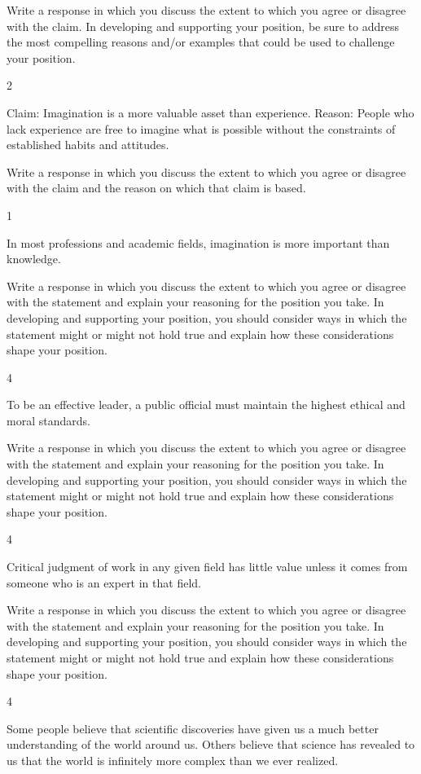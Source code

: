 \documentclass[]{article}
\begin{document}
Write a response in which you discuss the extent to which you agree or
disagree with the claim. In developing and supporting your position, be
sure to address the most compelling reasons and/or examples that could
be used to challenge your position.

2

Claim: Imagination is a more valuable asset than experience. Reason:
People who lack experience are free to imagine what is possible without
the constraints of established habits and attitudes.

Write a response in which you discuss the extent to which you agree or
disagree with the claim and the reason on which that claim is based.

1

In most professions and academic fields, imagination is more important
than knowledge.

Write a response in which you discuss the extent to which you agree or
disagree with the statement and explain your reasoning for the position
you take. In developing and supporting your position, you should
consider ways in which the statement might or might not hold true and
explain how these considerations shape your position.

4

To be an effective leader, a public official must maintain the highest
ethical and moral standards.

Write a response in which you discuss the extent to which you agree or
disagree with the statement and explain your reasoning for the position
you take. In developing and supporting your position, you should
consider ways in which the statement might or might not hold true and
explain how these considerations shape your position.

4

Critical judgment of work in any given field has little value unless it
comes from someone who is an expert in that field.

Write a response in which you discuss the extent to which you agree or
disagree with the statement and explain your reasoning for the position
you take. In developing and supporting your position, you should
consider ways in which the statement might or might not hold true and
explain how these considerations shape your position.

4

Some people believe that scientific discoveries have given us a much
better understanding of the world around us. Others believe that science
has revealed to us that the world is infinitely more complex than we
ever realized.
\end{document}
